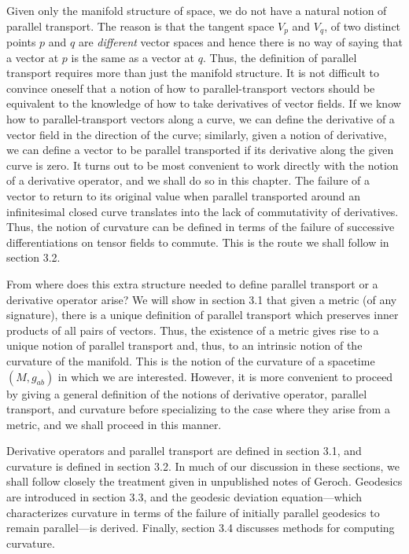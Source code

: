 Given only the manifold structure of space, we do not have a natural notion of parallel transport. The reason is that the tangent space $V_p$ and $V_q$, of two distinct points $p$ and $q$ are \emph{different} vector spaces and hence there is no way of saying that a vector at $p$ is the same as a vector at $q$. Thus, the definition of parallel transport requires more than just the manifold structure. It is not difficult to convince oneself that a notion of how to parallel-transport vectors should be equivalent to the knowledge of how to take derivatives of vector fields. If we know how to parallel-transport vectors along a curve, we can define the derivative of a vector field in the direction of the curve; similarly, given a notion of derivative, we can define a vector to be parallel transported if its derivative along the given curve is zero. It turns out to be most convenient to work directly with the notion of a derivative operator, and we shall do so in this chapter. The failure of a vector to return to its original value when parallel transported around an infinitesimal closed curve translates into the lack of commutativity of derivatives. Thus, the notion of curvature can be defined in terms of the failure of successive differentiations on tensor fields to commute. This is the route we shall follow in section 3.2.

From where does this extra structure needed to define parallel transport or a derivative operator arise? We will show in section 3.1 that given a metric (of any signature), there is a unique definition of parallel transport which preserves inner products of all pairs of vectors. Thus, the existence of a metric gives rise to a unique notion of parallel transport and, thus, to an intrinsic notion of the curvature of the manifold. This is the notion of the curvature of a spacetime $(M,g_{ab})$ in which we are interested. However, it is more convenient to proceed by giving a general definition of the notions of derivative operator, parallel transport, and curvature before specializing to the case where they arise from a metric, and we shall proceed in this manner.

Derivative operators and parallel transport are defined in section 3.1, and curvature is defined in section 3.2. In much of our discussion in these sections, we shall follow closely the treatment given in unpublished notes of Geroch. Geodesics are introduced in section 3.3, and the geodesic deviation equation—which characterizes curvature in terms of the failure of initially parallel geodesics to remain parallel—is derived. Finally, section 3.4 discusses methods for computing curvature.

